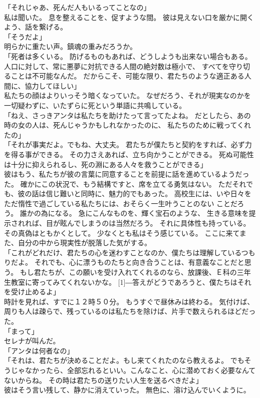 \documentclass[../IHMain]{subfiles}
\begin{document}
「それじゃあ、死んだ人もいるってことなの」\\
私は聞いた。
息を整えることを、促すような間。
彼は見えない口を厳かに開くよう、話を繋げる。\\
「そうだよ」\\
明らかに重たい声。鎮魂の重みだろうか。\\
「死者は多くいる。
防げるものもあれば、どうしようも出来ない場合もある。
人口に対して、常に悪夢に対抗できる人間の絶対数は極小で、
すべてを守り切ることは不可能なんだ。
だからこそ、可能な限り、君たちのような適正ある人間に、協力してほしい」\\
私たちの顔はよりいっそう暗くなっていた。
なぜだろう、それが現実なのかを一切疑わずに、いたずらに死という単語に共鳴している。\\
「ねえ、さっきアンタは私たちを助けたって言ってたよね。
だとしたら、あの時の女の人は、死んじゃうかもしれなかったのに、
私たちのために戦ってくれたの」\\
「それが事実だよ。でもね、大丈夫。
君たちが僕たちと契約をすれば、必ず力を得る事ができる。
その力さえあれば、立ち向かうことができる。
死ぬ可能性は十分に抑えられるし、死の淵にある人々を救うことができる」\\
彼はもう、私たちが彼の言葉に同意することを前提に話を進めているようだった。
確かにこの状況で、もう結構ですと、席を立てる勇気はない。
ただそれでも、彼の話は信じ難いと同時に、魅力的でもあった。
高校生には、いや日々をただ惰性で過ごしている私たちには、おそらく一生叶うことのない
ことだろう。
誰かの為になる。
急にこんなものを、輝く宝石のような、
生きる意味を提示されれば、目が眩んでしまうのは当然だろう。
それに具体性も持っている。
その真偽はともかくとして。
少なくとも私はそう感じている。
ここに来てまた、自分の中から現実性が脱落した気がする。\\
「これがどれだけ、君たちの心を迷わすことなのか、僕たちは理解しているつもりだよ。
それでも、心に漂うものたちと向き合うことは、有意義なことだと思う。
もし君たちが、この願いを受け入れてくれるのなら、放課後、Ｅ科の三年生教室に寄ってみてくれないかな。
\scalebox{3}[1]{―}答えがどうであろうと、僕たちはそれを受け止めるよ」\\
時計を見れば、すでに１２時５０分。
もうすぐで昼休みは終わる。
気付けば、周りも人は疎らで、残っているのは私たちを除けば、片手で数えられるほどだった。\\
「まって」\\
セレナが叫んだ。\\
「アンタは何者なの」\\
「それは、君たちが決めることだよ。もし来てくれたのなら教えるよ。
でもそうじゃなかったら、全部忘れるといい。こんなこと、心に潜めておく必要なんてないからね。
その時は君たちの送りたい人生を送るべきだよ」\\
彼はそう言い残して、静かに消えていった。
無色に、溶け込んでいくように。\\
\end{document}
